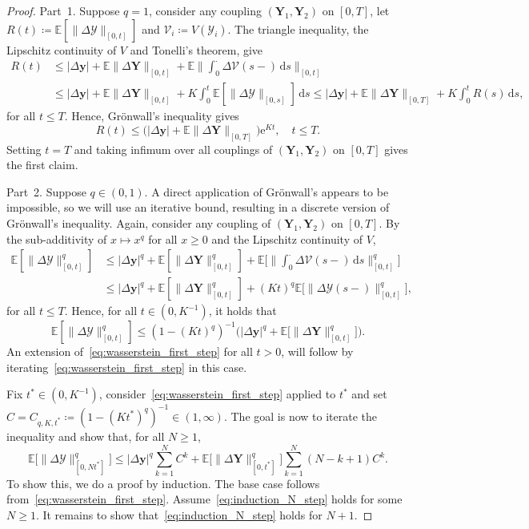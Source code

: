 \documentclass[10pt,a4paper]{amsart}
\newcommand{\D}{\mathrm{d}}
\newcommand\E{\mathds{E}}
\newcommand{\V}{\bm{\mathcal{V}}}
\newcommand\Y{\bm{\mathcal{Y}}}
\newcommand\e{\mathord{\mathrm{e}}}
\renewcommand\ge{\geqslant}
\renewcommand\le{\leqslant}
\begin{document}
\begin{proof}
Part~1. Suppose $q=1$, consider any coupling $(\bm{Y}_1,\bm{Y}_2)$ on $[0,T]$, let $R(t)\coloneqq \E[\|\Delta\Y\|_{[0,t]}]$ and $\V_i\coloneqq V(\Y_i)$. The triangle inequality, the Lipschitz continuity of $V$ and Tonelli's theorem, give
\begin{align*}
R(t) &\le |\Delta\bm{y}|+ \E\|\Delta\bm{Y}\|_{[0,t]}
+\E\bigg\| \int_0^\cdot \Delta\V(s-)\,\D s \bigg\|_{[0,t]} \\
&\le |\Delta\bm{y}|+ \E\|\Delta\bm{Y}\|_{[0,t]} + K \int_0^t \E[\|\Delta\Y\|_{[0,s]}]\, \D s
\le|\Delta\bm{y}| + \E\|\Delta\bm{Y}\|_{[0,T]} + K \int_0^t R(s)\, \D s,
\end{align*} 
for all $t\le T$. Hence, Gr\"onwall's inequality gives
\[
R(t) \le \big(|\Delta\bm{y}|
+ \E\|\Delta\bm{Y}\|_{[0,T]}\big) \e^{Kt},
\quad t\le T.
\]
Setting $t=T$ and taking infimum over all couplings of $(\bm{Y}_1,\bm{Y}_2)$ on $[0,T]$ gives the first claim.

Part~2. Suppose $q \in (0,1)$. A direct application of Gr\"onwall's appears to be impossible, so we will use an iterative bound, resulting in a discrete version of Gr\"onwall's inequality. Again, consider any coupling of $(\bm{Y}_1,\bm{Y}_2)$ on $[0,T]$. By the sub-additivity of $x \mapsto x^q$ for all $x \ge 0$ and the Lipschitz continuity of $V$, 
\begin{align*}
\E[\|\Delta\Y\|_{[0,t]}^q] 
&\le |\Delta\bm{y}|^q
+\E[\|\Delta\bm{Y}\|_{[0,t]}^q] 
+ \E\Bigg[\bigg\|\int_0^\cdot \Delta\V(s-) \,\D s \bigg\|^q_{[0,t]}\Bigg]\\
&\le |\Delta\bm{y}|^q
+\E[\|\Delta\bm{Y}\|_{[0,t]}^q] 
+ (Kt)^q \E\big[\|\Delta\Y(s-)\|^q_{[0,t]}\big], 
\end{align*} 
for all $t\le T$. Hence, for all $t\in (0,K^{-1})$, it holds that
\begin{equation}\label{eq:wasserstein_first_step}
\E[\|\Delta\Y\|_{[0,t]}^q] 
\le (1-(Kt)^q)^{-1} \big(|\Delta\bm{y}|^q 
+ \E\big[\|\Delta\bm{Y}\|_{[0,t]}^q\big]\big).
\end{equation} 
An extension of~\eqref{eq:wasserstein_first_step} for all $t>0$, will follow by iterating~\eqref{eq:wasserstein_first_step} in this case. 

Fix $t^* \in (0,K^{-1})$, consider~\eqref{eq:wasserstein_first_step} applied to $t^*$ and set $C = C_{q,K,t^*} \coloneqq (1-(Kt^*)^q)^{-1} \in (1,\infty)$. The goal is now to iterate the inequality and show that, for all $N \ge 1$,
\begin{equation}\label{eq:induction_N_step}
\E\big[\|\Delta\Y\|_{[0,Nt^*]}^q\big]
\le |\Delta\bm{y}|^q \sum_{k=1}^N C^k + \E\big[\|\Delta\bm{Y}\|_{[0,t^*]}^q\big] \sum_{k=1}^N (N-k+1)C^k.
\end{equation} 
To show this, we do a proof by induction. The base case follows from~\eqref{eq:wasserstein_first_step}. Assume~\eqref{eq:induction_N_step} holds for some $N\ge 1$. It remains to show that~\eqref{eq:induction_N_step} holds for $N+1$. 


\end{proof}
\end{document}
